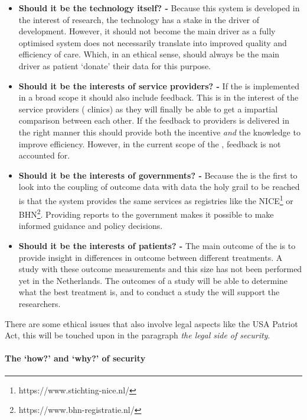 \begin{itemize}
	\item \textbf{Should it be the technology itself? -} Because this system is developed in the interest of research, the technology has a stake in the driver of development.
	However, it should not become the main driver as a fully optimised system does not necessarily translate into improved quality and efficiency of care.
	Which, in an ethical sense, should always be the main driver as patient `donate' their data for this purpose.
	\item \textbf{Should it be the interests of service providers? -} If the \ivfsystem{} is implemented in a broad scope it should also include feedback.
	This is in the interest of the service providers (\ie{} clinics) as they will finally be able to get a impartial comparison between each other.
	If the feedback to providers is delivered in the right manner this should provide both the incentive \emph{and} the knowledge to improve efficiency.
	However, in the current scope of the \project{}, feedback is not accounted for.
	\item \textbf{Should it be the interests of governments? -} Because the \project{} is the first to look into the coupling of outcome data with \IVF{} data the holy grail to be reached is that the system provides the same services as registries like the NICE\footnote{https://www.stichting-nice.nl/} or BHN\footnote{https://www.bhn-registratie.nl/}.
	Providing reports to the government makes it possible to make informed guidance and policy decisions.
	\item \textbf{Should it be the interests of patients? -} The main outcome of the \project{} is to provide insight in differences in outcome between different \IVF{} treatments.
	A study with these outcome measurements and this size has not been performed yet in the Netherlands.
	The outcomes of a study will be able to determine what the best treatment is, and to conduct a study the \ivfsystem{} will support the researchers.
\end{itemize}

There are some ethical issues that also involve legal aspects like the USA Patriot Act, this will be touched upon in the paragraph \emph{the legal side of security}.

\paragraph{The `how?' and `why?' of security}
\label{security-how-why}

